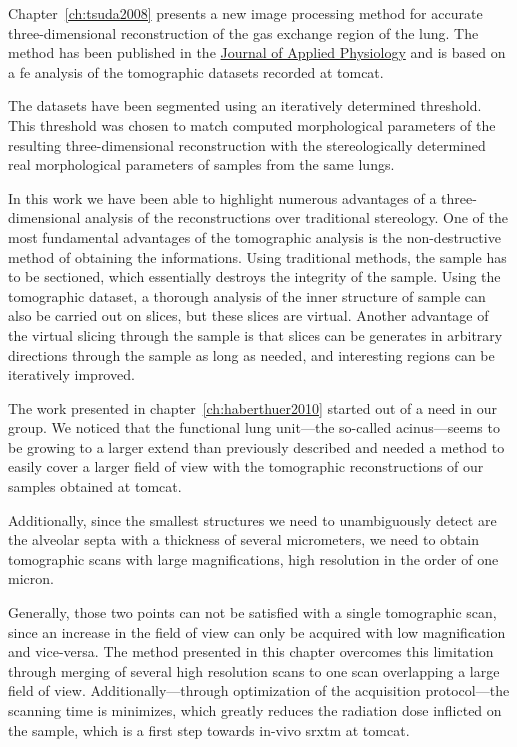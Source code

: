 Chapter~\ref{ch:tsuda2008} presents a new image processing method for accurate three-dimensional reconstruction of the gas exchange region of the lung. The method has been  published in the \href{http://jap.physiology.org/}{Journal of Applied Physiology} and is based on a \ac{fe} analysis of the tomographic datasets recorded at \ac{tomcat}. 

The datasets have been segmented using an iteratively determined threshold. This threshold was chosen to match computed morphological parameters of the resulting three-dimensional reconstruction with the stereologically  determined real morphological parameters of samples from the same lungs.

In this work we have been able to highlight numerous advantages of a three-dimensional analysis of the reconstructions over traditional stereology. One of the most fundamental advantages of the tomographic analysis is the non-destructive method of obtaining the informations. Using traditional methods, the sample has to be sectioned, which essentially destroys the integrity of the sample. Using the tomographic dataset, a thorough analysis of the inner structure of sample can also be carried out on slices, but these slices are virtual. Another advantage of the virtual slicing through the sample is that slices can be generates in arbitrary directions through the sample as long as needed, and interesting regions can be iteratively improved.

The work presented in chapter~\ref{ch:haberthuer2010} started out of a need in our group. We noticed that the functional lung unit---the so-called acinus---seems to be growing to a larger extend than previously described  and needed a method to easily cover a larger field of view with the tomographic reconstructions of our samples obtained at \ac{tomcat}. 

Additionally, since the smallest structures we need to unambiguously detect are the alveolar septa with a thickness of several micrometers, we need to obtain tomographic scans with large magnifications, \ie high resolution in the order of one micron. 

Generally, those two points can not be satisfied with a single tomographic scan, since an increase in the field of view can only be acquired with low magnification and vice-versa. The method presented in this chapter overcomes this limitation through merging of several high resolution scans to one scan overlapping a large field of view. Additionally---through optimization of the acquisition protocol---the scanning time is minimizes, which greatly reduces the radiation dose inflicted on the sample, which is a first step towards in-vivo \ac{srxtm} at \ac{tomcat}.

